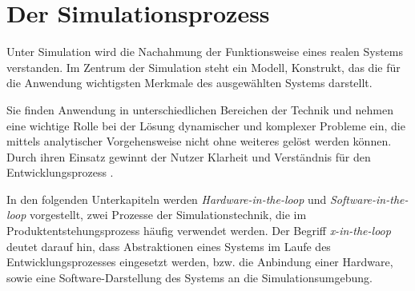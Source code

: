 
\section{Der Simulationsprozess}
 
Unter Simulation wird die Nachahmung der Funktionsweise eines realen Systems verstanden. Im Zentrum der Simulation steht ein Modell, Konstrukt, das die für die Anwendung wichtigsten Merkmale des ausgewählten Systems darstellt. 

Sie finden Anwendung in unterschiedlichen Bereichen der Technik und nehmen eine wichtige Rolle bei der Lösung dynamischer und komplexer Probleme ein, die mittels analytischer Vorgehensweise nicht ohne weiteres gelöst werden können. Durch ihren Einsatz gewinnt der Nutzer Klarheit und Verständnis für den Entwicklungsprozess \cite{zimmerDurchgaengigerSimulationsprozessZur2015}. 

In den folgenden Unterkapiteln werden \textit{Hardware-in-the-loop} und \textit{Software-in-the-loop} vorgestellt, zwei Prozesse der Simulationstechnik, die im Produktentstehungsprozess häufig verwendet werden. Der Begriff \textit{x-in-the-loop} deutet darauf hin, dass Abstraktionen eines Systems im Laufe des Entwicklungsprozesses eingesetzt werden, bzw. die Anbindung einer Hardware, sowie eine Software-Darstellung des Systems an die Simulationsumgebung.

